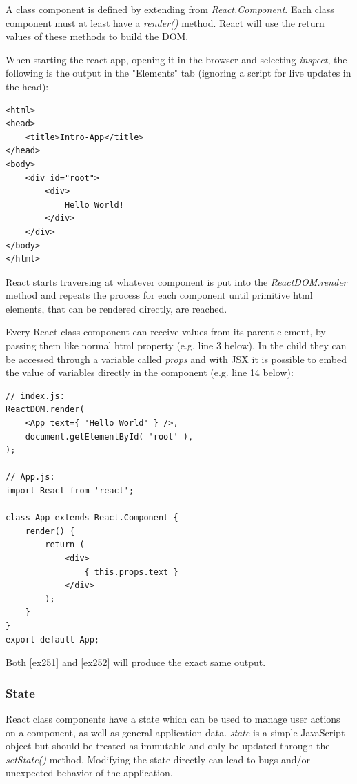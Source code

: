 A class component is defined by extending from \emph{React.Component}. Each class component must at least have a \emph{render()} method. React will use the return values of these methods to build the DOM.

When starting the react app, opening it in the browser and selecting \emph{inspect}, the following is the output in the "Elements" tab (ignoring a script for live updates in the head):

\lstset{language=HTML}
\begin{lstlisting}[caption={Resulting HTML after building}]
<html> 
<head>
	<title>Intro-App</title>
</head>
<body>
	<div id="root">
		<div>
			Hello World!
		</div>
	</div>
</body>
</html>
\end{lstlisting}

React starts traversing at whatever component is put into the \emph{ReactDOM.render} method and repeats the process for each component until primitive html elements, that can be rendered directly, are reached.

Every React class component can receive values from its parent element, by passing them like normal html property (e.g. line 3 below). In the child they can be accessed through a variable called \emph{props} and with JSX it is possible to embed the value of variables directly in the component (e.g. line 14 below):

\lstset{language=JavaScript}
\begin{lstlisting}[caption={Using Props},label={ex252}]
// index.js:
ReactDOM.render(
	<App text={ 'Hello World' } />,
	document.getElementById( 'root' ),
);

// App.js:
import React from 'react';

class App extends React.Component {
	render() {
		return (
			<div>
				{ this.props.text }
			</div>
		);
	}
}
export default App;
\end{lstlisting}
Both \autoref{ex251} and \autoref{ex252} will produce the exact same output.

\subsubsection{State}
React class components have a state which can be used to manage user actions on a component, as well as general application data. \emph{state} is a simple JavaScript object but should be treated as immutable and only be updated through the \emph{setState()} method. Modifying the state directly can lead to bugs and/or unexpected behavior of the application.

